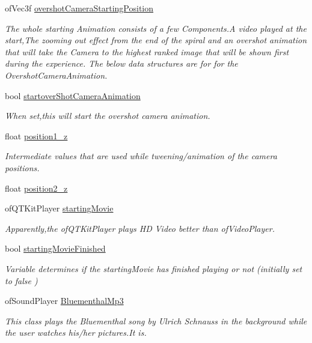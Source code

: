 \begin{DoxyCompactItemize}
of\-Vec3f \hyperlink{classtest_app_a846feea7c2c4d4b1929bb72c546b3e19}{overshot\-Camera\-Starting\-Position}
\begin{DoxyCompactList}\small\item\em The whole starting Animation consists of a few Components.\-A video played at the start,The zooming out effect from the end of the spiral and an overshot animation that will take the Camera to the highest ranked image that will be shown first during the experience. The below data structures are for for the Overshot\-Camera\-Animation. \end{DoxyCompactList}\item 
bool \hyperlink{classtest_app_ad2fca6ce5e37462cd820afc48633324d}{startover\-Shot\-Camera\-Animation}
\begin{DoxyCompactList}\small\item\em When set,this will start the overshot camera animation. \end{DoxyCompactList}\item 
float \hyperlink{classtest_app_a808376783cdf510335cd1b37026e9bb3}{position1\-\_\-z}
\begin{DoxyCompactList}\small\item\em Intermediate values that are used while tweening/animation of the camera positions. \end{DoxyCompactList}\item 
float \hyperlink{classtest_app_a0720011cfaade6388109232ea4927c19}{position2\-\_\-z}
\item 
of\-Q\-T\-Kit\-Player \hyperlink{classtest_app_a9bfe7793fa0689a991ff64174745c38f}{starting\-Movie}
\begin{DoxyCompactList}\small\item\em Apparently,the of\-Q\-T\-Kit\-Player plays H\-D Video better than of\-Video\-Player. \end{DoxyCompactList}\item 
bool \hyperlink{classtest_app_aea3cb9f5f0061a42a4953d6b6c949036}{starting\-Movie\-Finished}
\begin{DoxyCompactList}\small\item\em Variable determines if the starting\-Movie has finished playing or not (initially set to false ) \end{DoxyCompactList}\item 
of\-Sound\-Player \hyperlink{classtest_app_af696fd13ee9ecb38ac0ba0b72543ce06}{Bluementhal\-Mp3}
\begin{DoxyCompactList}\small\item\em This class plays the Bluementhal song by Ulrich Schnauss in the background while the user watches his/her pictures.\-It is. \end{DoxyCompactList}\item 

\end{DoxyCompactItemize}
